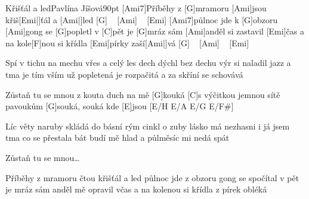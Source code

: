 \begin{song}{Křišťál a led}{Pavlína Jíšová}{90pt}
%
[Ami7]Příběhy z [G]mramoru [Ami]jsou křiš[Emi|]{ťál a} [Ami|]{led} [G] ~ [Ami] ~ [Emi]{}
[Ami7]půlnoc jde k [G]obzoru [Ami]gong se [G]popletl v [C]pět
je [G]mráz sám [Ami]anděl si zastavil [Emi]{čas}
a na kole[F]nou si křídla [Emi]pírky zaší[Ami|]{vá} [G] ~ [Ami] ~ [Emi]{}

%
Spí v tichu na mechu vřes a celý les
dech dýchl bez dechu výr si naladil jazz
a tma je tím vším už popletená
je rozpačitá a za skříní se schovává

\chorus%
[C]Zůstaň tu se mnou z kouta duch na mě [G]kouká
[C]s výčitkou jemnou sítě pavoukům [G]souká, souká
kde [E]jsou [E/H E/A E/G E/F#]{}

%
Líc věty naruby skládá do básní
rým cinkl o zuby lásko má nezhasni
i já jsem tma co se přestala bát
budí mě hlad a půlměsíc mi nedá spát

\chorus%
Zůstaň tu se mnou\dots

%
Příběhy z mramoru čtou křišťál a led
půlnoc jde z obzoru gong se spočítal v pět
je mráz sám anděl mě opravil včas
a na kolenou si křídla z pírek obléká
\end{song}

